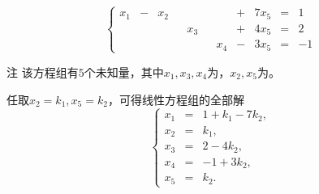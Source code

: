 \begin{frame}
  \begin{footnotesize}
    $$
    \left\{
    \begin{array}{rcrcrcrcrcrr}
      x_1 & - &  x_2 &   &      &   &       & + & 7x_5 & = & 1 \\[0.1cm]
      &   &     &   &  x_3 &   &     & + & 4x_5 & = & 2 \\[0.1cm]
      &   &   &   &    &   &   x_4 & - & 3x_5 & = &-1
    \end{array}
    \right.
    $$
    \pause
    \begin{block}{注}
      该方程组有$5$个未知量，其中$x_1,x_3,x_4$为，$x_2,x_5$为。
    \end{block}
    \pause 
    任取$x_2=k_1, x_5=k_2$，可得线性方程组的全部解
    $$
    \left\{
    \begin{array}{ccl}
      x_1 &=& 1+k_1-7k_2, \\[0.1cm]      
      x_2 &=& k_1, \\[0.1cm]
      x_3 &=& 2-4k_2, \\[0.1cm]
      x_4 &=& -1+3k_2,\\[0.1cm]
      x_5 &=& k_2.
    \end{array}
    \right.
    $$
    
  \end{footnotesize}
\end{frame}


